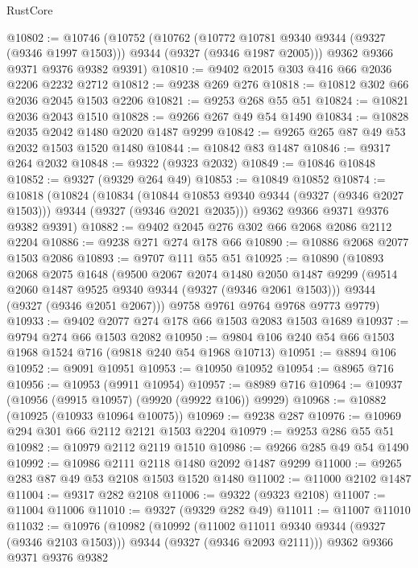 \begin{lexlean}{RustCore}
\begin{coremodule}
@10802 := @10746
    (@10752
      (@10762
        (@10772 @10781 @9340 @9344 (@9327 (@9346 @1997 @1503)))
        @9344
        (@9327 (@9346 @1987 @2005)))
      @9362
      @9366
      @9371
      @9376
      @9382
      @9391)
@10810 := @9402 @2015 @303 @416 @66 @2036 @2206 @2232 @2712
@10812 := @9238 @269 @276
@10818 := @10812 @302 @66 @2036 @2045 @1503 @2206
@10821 := @9253 @268 @55 @51
@10824 := @10821 @2036 @2043 @1510
@10828 := @9266 @267 @49 @54 @1490
@10834 := @10828 @2035 @2042 @1480 @2020 @1487 @9299
@10842 := @9265 @265 @87 @49 @53 @2032 @1503 @1520 @1480
@10844 := @10842 @83 @1487
@10846 := @9317 @264 @2032
@10848 := @9322 (@9323 @2032)
@10849 := @10846 @10848
@10852 := @9327 (@9329 @264 @49)
@10853 := @10849 @10852
@10874 := @10818
    (@10824
      (@10834
        (@10844 @10853 @9340 @9344 (@9327 (@9346 @2027 @1503)))
        @9344
        (@9327 (@9346 @2021 @2035)))
      @9362
      @9366
      @9371
      @9376
      @9382
      @9391)
@10882 := @9402 @2045 @276 @302 @66 @2068 @2086 @2112 @2204
@10886 := @9238 @271 @274 @178 @66
@10890 := @10886 @2068 @2077 @1503 @2086
@10893 := @9707 @111 @55 @51
@10925 := @10890
    (@10893
      @2068
      @2075
      @1648
      (@9500
        @2067
        @2074
        @1480
        @2050
        @1487
        @9299
        (@9514 @2060 @1487 @9525 @9340 @9344 (@9327 (@9346 @2061 @1503)))
        @9344
        (@9327 (@9346 @2051 @2067)))
      @9758
      @9761
      @9764
      @9768
      @9773
      @9779)
@10933 := @9402 @2077 @274 @178 @66 @1503 @2083 @1503 @1689
@10937 := @9794 @274 @66 @1503 @2082
@10950 := @9804 @106 @240 @54 @66 @1503 @1968 @1524 @716 (@9818 @240 @54 @1968 @10713)
@10951 := @8894 @106
@10952 := @9091 @10951
@10953 := @10950 @10952
@10954 := @8965 @716
@10956 := @10953 (@9911 @10954)
@10957 := @8989 @716
@10964 := @10937 (@10956 (@9915 @10957) (@9920 (@9922 @106)) @9929)
@10968 := @10882 (@10925 (@10933 @10964 @10075))
@10969 := @9238 @287
@10976 := @10969 @294 @301 @66 @2112 @2121 @1503 @2204
@10979 := @9253 @286 @55 @51
@10982 := @10979 @2112 @2119 @1510
@10986 := @9266 @285 @49 @54 @1490
@10992 := @10986 @2111 @2118 @1480 @2092 @1487 @9299
@11000 := @9265 @283 @87 @49 @53 @2108 @1503 @1520 @1480
@11002 := @11000 @2102 @1487
@11004 := @9317 @282 @2108
@11006 := @9322 (@9323 @2108)
@11007 := @11004 @11006
@11010 := @9327 (@9329 @282 @49)
@11011 := @11007 @11010
@11032 := @10976
    (@10982
      (@10992
        (@11002 @11011 @9340 @9344 (@9327 (@9346 @2103 @1503)))
        @9344
        (@9327 (@9346 @2093 @2111)))
      @9362
      @9366
      @9371
      @9376
      @9382

\end{coremodule}
\end{lexlean}
